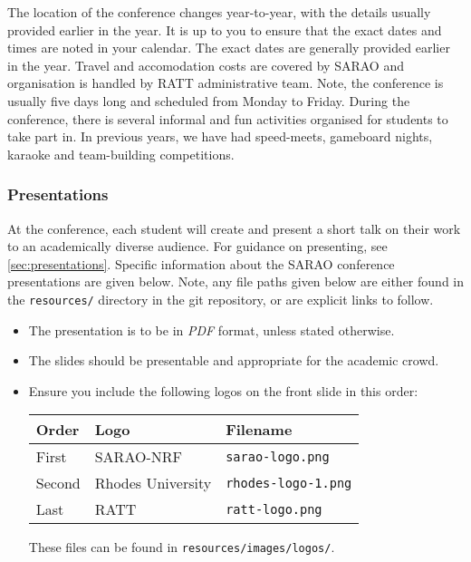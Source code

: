 \documentclass[12pt]{article}
\begin{document}
        The location of the conference changes year-to-year, with the details usually provided earlier in the year. It is up to you to ensure that the exact dates and times are noted in your calendar. The exact dates are generally provided earlier in the year. Travel and accomodation costs are covered by SARAO and organisation is handled by RATT administrative team. Note, the conference is usually five days long and scheduled from Monday to Friday. During the conference, there is several informal and fun activities organised for students to take part in. In previous years, we have had speed-meets, gameboard nights, karaoke and team-building competitions.


    \subsubsection{Presentations}\label{subsubsec:presentations}
        At the conference, each student will create and present a short talk on their work to an academically diverse audience. For guidance on presenting, see \cref{sec:presentations}. Specific information about the SARAO conference presentations are given below. Note, any file paths given below are either found in the \texttt{resources/} directory in the git repository, or are explicit links to follow.

        \begin{itemize}
            \item The presentation is to be in \emph{PDF} format, unless stated otherwise.
            \item The slides should be presentable and appropriate for the academic crowd.
            \item Ensure you include the following logos on the front slide in this order:
            \begin{table}[H]
                \centering
                \begin{tabular}{lll}
                    {\color{ratt-primary} Order} & Logo & Filename \\
                    \midrule
                    First & SARAO-NRF & \texttt{sarao-logo.png} \\
                    Second & Rhodes University & \texttt{rhodes-logo-1.png} \\
                    Last & RATT & \texttt{ratt-logo.png} \\
                    \bottomrule
                \end{tabular}
            \end{table}
            These files can be found in \texttt{resources/images/logos/}.
        \end{itemize}
\end{document}
